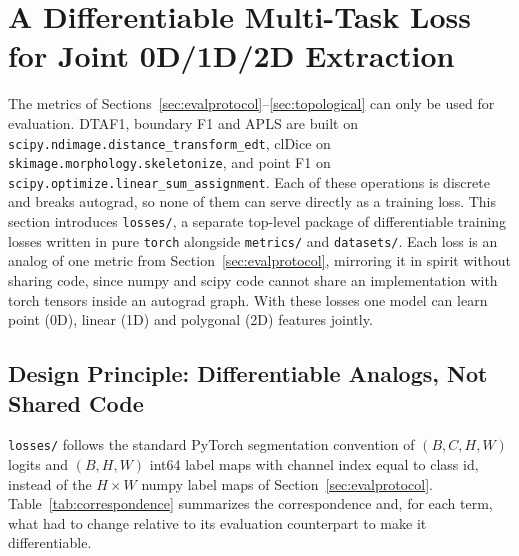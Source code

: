 \section{A Differentiable Multi-Task Loss for Joint 0D/1D/2D Extraction}
\label{sec:method}

The metrics of Sections~\ref{sec:evalprotocol}--\ref{sec:topological} can only be used for
evaluation. DTAF1, boundary F1 and APLS are built on \texttt{scipy.ndimage.distance\_transform\_edt},
clDice on \texttt{skimage.morphology.skeletonize}, and point F1 on
\texttt{scipy.optimize.linear\_sum\_assignment}. Each of these operations is discrete and breaks
autograd, so none of them can serve directly as a training loss. This section introduces
\texttt{losses/}, a separate top-level package of differentiable training losses written in pure
\texttt{torch} alongside \texttt{metrics/} and \texttt{datasets/}. Each loss is an analog of one
metric from Section~\ref{sec:evalprotocol}, mirroring it in spirit without sharing code, since
numpy and scipy code cannot share an implementation with torch tensors inside an autograd graph.
With these losses one model can learn point (0D), linear (1D) and polygonal (2D) features jointly.

\subsection{Design Principle: Differentiable Analogs, Not Shared Code}
\label{subsec:method-principle}

\texttt{losses/} follows the standard PyTorch segmentation convention of $(B,C,H,W)$ logits and
$(B,H,W)$ int64 label maps with channel index equal to class id, instead of the $H\times W$ numpy
label maps of Section~\ref{sec:evalprotocol}. Table~\ref{tab:correspondence} summarizes the
correspondence and, for each term, what had to change relative to its evaluation counterpart to
make it differentiable.

